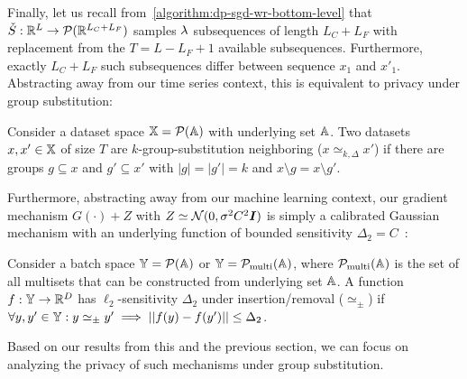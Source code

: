 Finally, let us recall from~\cref{algorithm:dp-sgd-wr-bottom-level} that $\check{S} : {\mathbb{R}}^{L} \rightarrow \mathcal{P}({\mathbb{R}}^{L_C + L_F})$
samples $\lambda$ subsequences of length $L_C + L_F$ with replacement from the $T = L - L_F + 1$ available subsequences.
Furthermore, exactly $L_C+L_F$ such subsequences differ between sequence $x_1$ and $x'_1$.
Abstracting away from our time series context, this is equivalent to privacy under group substitution:
\begin{definition}
    Consider a dataset space ${\mathbb{X}} = \mathcal{P}({\mathbb{A}})$ with underlying set ${\mathbb{A}}$.
    Two datasets $x, x' \in {\mathbb{X}}$ of size $T$ are $k$-group-substitution neighboring
    ($x \simeq_{k,\Delta} x'$)
    if there are groups $g \subseteq x$ and $g' \subseteq x'$  with $|g| = |g'| = k$
    and $x \setminus g = x \setminus g'$.
\end{definition}
Furthermore, abstracting away from our machine learning context,
our gradient mechanism $G(\cdot) + Z$ with $Z \simeq \mathcal{N}(0,\sigma^2 C^2 {\bm{I}})$ is simply a calibrated Gaussian mechanism with an underlying function of bounded sensitivity $\Delta_2 = C$~\cite{song2013stochastic}:
\begin{definition}
    Consider a batch space ${\mathbb{Y}} = \mathcal{P}({\mathbb{A}})$ or ${\mathbb{Y}} = \mathcal{P}_\mathrm{multi}({\mathbb{A}})$,
    where $\mathcal{P}_\mathrm{multi}({\mathbb{A}})$ is the set of all multisets that can be constructed from underlying set ${\mathbb{A}}$.
    A function $f : {\mathbb{Y}} \rightarrow {\mathbb{R}}^D$ has $\ell_2$-sensitivity $\Delta_2$ under insertion/removal ($\simeq_\pm$)
    if $\forall y, y' \in {\mathbb{Y}} : y \simeq_\pm y' \implies ||f(y) - f(y')|| \leq \Delta_2$.
\end{definition}
Based on our results from this and the previous section, we can focus on analyzing the privacy of such mechanisms under group substitution.

